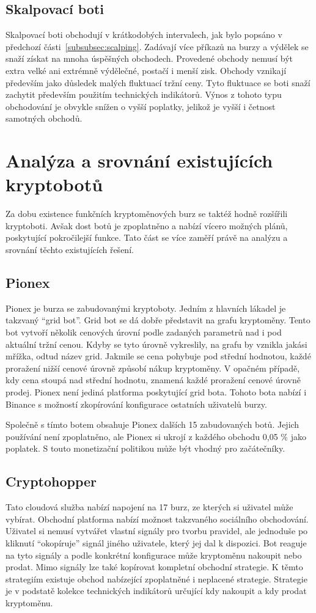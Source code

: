 \subsection{Skalpovací boti}
Skalpovací boti obchodují v krátkodobých intervalech, jak bylo popsáno v předchozí části~\ref{subsubsec:scalping}. Zadávají více příkazů na burzy a výdělek se snaží
získat na mnoha úspěšných obchodech. Provedené obchody nemusí být extra velké ani extrémně výdělečné, postačí i menší zisk. Obchody vznikají především jako důsledek
malých fluktuací tržní ceny. Tyto fluktuace se boti snaží zachytit především použitím technických indikátorů. Výnos z tohoto typu obchodování je obvykle snížen o vyšší
poplatky, jelikož je vyšší i četnost samotných obchodů.


\section{Analýza a srovnání existujících kryptobotů}
Za dobu existence funkčních kryptoměnových burz se taktéž hodně rozšířili kryptoboti. Avšak dost botů je zpoplatněno a nabízí vícero možných plánů, poskytující
pokročilejší funkce. Tato část se více zaměří právě na analýzu a srovnání těchto existujících řešení.

\subsection{Pionex}
Pionex je burza se zabudovanými kryptoboty. Jedním z hlavních lákadel je takzvaný \enquote{grid bot}. Grid bot se dá dobře představit na grafu kryptoměny. Tento bot
vytvoří několik cenových úrovní podle zadaných parametrů nad i pod aktuální tržní cenou. Kdyby se tyto úrovně vykreslily, na grafu by vznikla jakási mřížka, odtud název
grid. Jakmile se cena pohybuje pod střední hodnotou, každé proražení nižší cenové úrovně způsobí nákup kryptoměny. V opačném případě, kdy cena stoupá nad střední hodnotu,
znamená každé proražení cenové úrovně prodej. Pionex není jediná platforma poskytující grid bota. Tohoto bota nabízí i Binance s možností zkopírování konfigurace
ostatních uživatelů burzy.

Společně s tímto botem obsahuje Pionex dalších 15 zabudovaných botů. Jejich používání není zpoplatněno, ale Pionex si ukrojí z každého obchodu 0,05 \% jako poplatek.
S touto monetizační politikou může být vhodný pro začátečníky.

\subsection{Cryptohopper}
Tato cloudová služba nabízí napojení na 17 burz, ze kterých si uživatel může vybírat. Obchodní platforma nabízí možnost takzvaného sociálního obchodování. Uživatel si
nemusí vytvářet vlastní signály pro tvorbu pravidel, ale jednoduše po kliknutí \enquote{okopíruje} signál jiného uživatele, který jej dal k dispozici. Bot reaguje na tyto
signály a podle konkrétní konfigurace může kryptoměnu nakoupit nebo prodat. Mimo signály lze také kopírovat kompletní obchodní strategie. K těmto strategiím existuje
obchod nabízející zpoplatněné i neplacené strategie. Strategie je v podstatě kolekce technických indikátorů určující kdy nakoupit a kdy prodat kryptoměnu.

